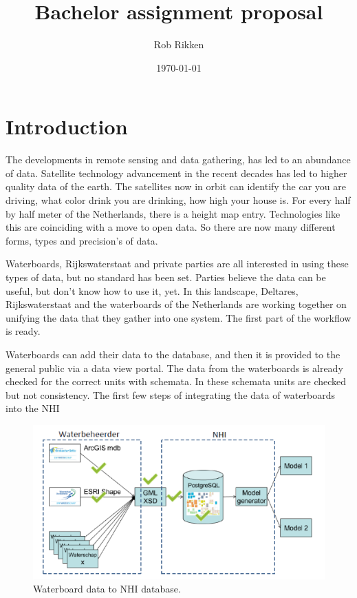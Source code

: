 \documentclass{article}
\title{\textbf{Bachelor assignment proposal}}
\author{Rob Rikken}
\date{\today}
\begin{document}
\maketitle
\newpage
\tableofcontents
\newpage
\listoffigures
 \newpage
\listoftables
\newpage

\section{Introduction}
The developments in remote sensing and data gathering, has led to an abundance of data.
Satellite technology advancement in the recent decades has led to higher quality data of the earth.
The satellites now in orbit can identify the car you are driving, what color drink you are drinking, how high your house is.
For every half by half meter of the Netherlands, there is a height map entry.
Technologies like this are coinciding with a move to open data.
So there are now many different forms, types and precision's of data.

Waterboards, Rijkswaterstaat and private parties are all interested in using these types of data, but no standard has been set.
Parties believe the data can be useful, but don't know how to use it, yet. In this landscape, Deltares, Rijkswaterstaat and the waterboards of the Netherlands are working together on unifying the data that they gather into one system.
The first part of the workflow is ready. 

Waterboards can add their data to the database, and then it is provided to the general public via a data view portal. The data from the waterboards is already checked for the correct units with schemata. In these schemata units are checked but not consistency. The first few steps of integrating the data of waterboards into the NHI

\begin{figure}[h]
    \centering
    \includegraphics[width=\textwidth]{figures/database_nhi_flowchart.png}
    \caption{Waterboard data to NHI database.\cite{Kroon2016Overzicht}}
    \label{fig:nhi_data_cross_section}
\end{figure}
\end{document}

